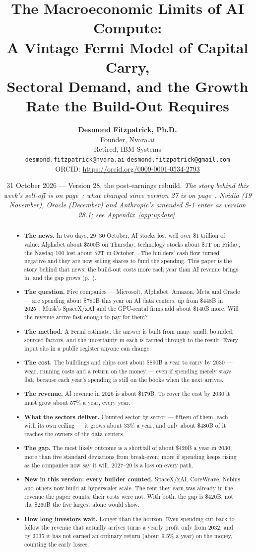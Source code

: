 \documentclass[11pt,letterpaper]{article}
\title{\textbf{\Large The Macroeconomic Limits of AI Compute: \\ A Vintage Fermi Model of Capital Carry, \\ Sectoral Demand, and the Growth Rate the Build-Out Requires}}
\author{\textbf{Desmond Fitzpatrick, Ph.D.} \\
\small Founder, Nvara.ai \\
\small Retired, IBM Systems \\
\small \texttt{desmond.fitzpatrick@nvara.ai} \quad \texttt{desmond.fitzpatrick@gmail.com} \\
\small ORCID: \url{https://orcid.org/0009-0001-0534-2793}}
\date{31 October 2026 --- Version 28, the post-earnings rebuild. \textit{The story behind this week's sell-off is on page~\pageref{sec:news}; what changed since version 27 is on page~\pageref{sec:v28}. Nvidia (19 November), Oracle (December) and Anthropic's amended S-1 enter as version 28.1; see Appendix~\ref{app:update}.}}
\begin{document}
\maketitle

\begin{abstract}
\begin{itemize}\setlength\itemsep{0.35em}
\item \textbf{The news.} In two days, 29--30 October, AI stocks lost well over \$1 trillion of value: Alphabet about \$500B on Thursday, technology stocks about \$1T on Friday; the Nasdaq-100 lost about \$2T in October~\cite{ref:cnbc_goog_1029,ref:nbc_1030,ref:reuters_1030}. The builders' cash flow turned negative and they are now selling shares to fund the spending. This paper is the story behind that news: the build-out costs more each year than AI revenue brings in, and the gap grows (p.~\pageref{sec:news}).
\item \textbf{The question.} Five companies --- Microsoft, Alphabet, Amazon, Meta and Oracle --- are spending about \$780B this year on AI data centers, up from \$448B in 2025~\cite{ref:epoch_capex,ref:mlq2026}; Musk's SpaceX/xAI and the GPU-rental firms add about \$140B more. Will the revenue arrive fast enough to pay for them?
\item \textbf{The method.} A Fermi estimate: the answer is built from many small, bounded, sourced factors, and the uncertainty in each is carried through to the result. Every input sits in a public register anyone can change.
\item \textbf{The cost.} The buildings and chips cost about \$890B a year to carry by 2030 --- wear, running costs and a return on the money --- even if spending merely stays flat, because each year's spending is still on the books when the next arrives.
\item \textbf{The revenue.} AI revenue in 2026 is about \$179B. To cover the cost by 2030 it must grow about 57\% a year, every year.
\item \textbf{What the sectors deliver.} Counted sector by sector --- fifteen of them, each with its own ceiling --- it grows about 33\% a year, and only about \$480B of it reaches the owners of the data centers.
\item \textbf{The gap.} The most likely outcome is a shortfall of about \$420B a year in 2030, more than five standard deviations from break-even; more if spending keeps rising as the companies now say it will. 2027--29 is a loss on every path.
\item \textbf{New in this version: every builder counted.} SpaceX/xAI, CoreWeave, Nebius and others now build at hyperscaler scale. The rent they earn was already in the revenue the paper counts; their costs were not. With both, the gap is \$420B, not the \$260B the five largest alone would show.
\item \textbf{How long investors wait.} Longer than the horizon. Even spending cut back to follow the revenue that actually arrives turns a yearly profit only from 2032, and by 2035 it has not earned an ordinary return (about 9.5\% a year) on the money, counting the early losses.


\end{itemize}
\end{abstract}
\end{document}
